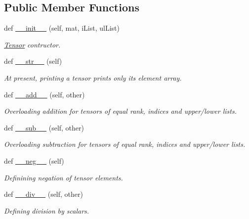 \subsection*{Public Member Functions}
\begin{DoxyCompactItemize}
\item 
def \hyperlink{class_py_spinor_1_1_tensor_1_1_tensor_a58442b72d740de25daf5e088909f2b5c}{\+\_\+\+\_\+init\+\_\+\+\_\+} (self, mat, i\+List, ul\+List)
\begin{DoxyCompactList}\small\item\em \hyperlink{class_py_spinor_1_1_tensor_1_1_tensor}{Tensor} contructor. \end{DoxyCompactList}\item 
def \hyperlink{class_py_spinor_1_1_tensor_1_1_tensor_ac05df443fff49c9d1829ed85a9e2a322}{\+\_\+\+\_\+str\+\_\+\+\_\+} (self)
\begin{DoxyCompactList}\small\item\em At present, printing a tensor prints only its element array. \end{DoxyCompactList}\item 
def \hyperlink{class_py_spinor_1_1_tensor_1_1_tensor_afe6e90540db57018f6a4d2b2c996f7eb}{\+\_\+\+\_\+add\+\_\+\+\_\+} (self, other)
\begin{DoxyCompactList}\small\item\em Overloading addition for tensors of equal rank, indices and upper/lower lists. \end{DoxyCompactList}\item 
def \hyperlink{class_py_spinor_1_1_tensor_1_1_tensor_a3ff6a865cd53e5d7a2b075da1cadcef4}{\+\_\+\+\_\+sub\+\_\+\+\_\+} (self, other)
\begin{DoxyCompactList}\small\item\em Overloading subtraction for tensors of equal rank, indices and upper/lower lists. \end{DoxyCompactList}\item 
def \hyperlink{class_py_spinor_1_1_tensor_1_1_tensor_a66e613f568c510d30dbd85676984ebf5}{\+\_\+\+\_\+neg\+\_\+\+\_\+} (self)
\begin{DoxyCompactList}\small\item\em Definining negation of tensor elements. \end{DoxyCompactList}\item 
def \hyperlink{class_py_spinor_1_1_tensor_1_1_tensor_a4015087def592e448dd5d27360746220}{\+\_\+\+\_\+div\+\_\+\+\_\+} (self, other)
\begin{DoxyCompactList}\small\item\em Defining division by scalars. \end{DoxyCompactList}\item 

\end{DoxyCompactItemize}
